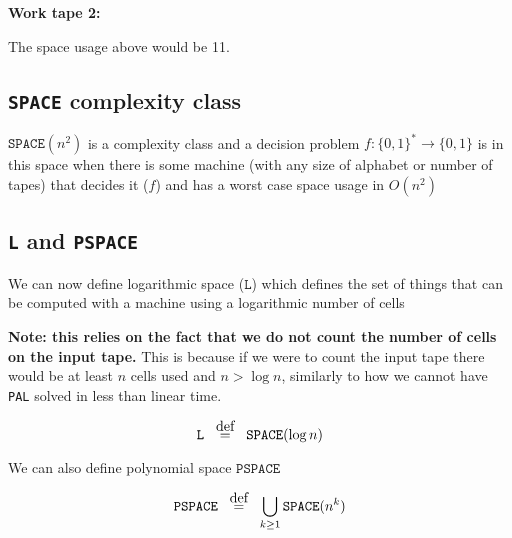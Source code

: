 \documentclass{article}
\newcommand\defeq{\stackrel{\mathclap{\normalfont\mbox{def}}}{=}}
\begin{document}
  \textbf{Work tape 2:}
  \begin{center}



  \end{center}

  The space usage above would be 11.

  \subsection{\texttt{SPACE} complexity class}

  $\texttt{SPACE} (n^{2})$ is a complexity class and a decision problem $f: \{ 0,1 \}^{*} \rightarrow \{ 0,1 \}  $ is in this space when there is some machine (with any size of alphabet or number of tapes) that decides it ($f$) and has a worst case space usage in $O(n^{2})$


  \subsection{\texttt{L} and \texttt{PSPACE} }

  We can now define logarithmic space ($\texttt{L} $) which defines the set of things that can be computed with a machine using a logarithmic number of cells

  \textbf{Note: this relies on the fact that we do not count the number of cells on the input tape.} This is because if we were to count the input tape there would be at least $n$ cells used and $n > \log n$, similarly to how we cannot have \texttt{PAL} solved in less than linear time.

  \[
    \texttt{L}  \;\;\; \defeq  \;\;\; \texttt{SPACE}(\log n)
  \]

  We can also define polynomial space $\texttt{PSPACE} $

  \[
    \texttt{PSPACE} \;\;\; \defeq \;\;\; \bigcup_{k\geq1} \texttt{SPACE} (n^{k})
  \]
\end{document}
